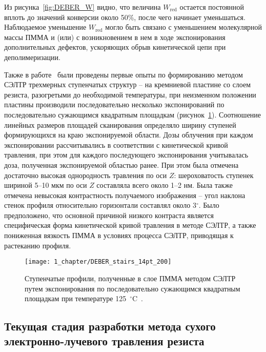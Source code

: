 Из рисунка~\ref{fig:DEBER_W} видно, что величина $W_\mathrm{red}$ остается постоянной вплоть до значений конверсии около 50\%, после чего начинает уменьшаться. Наблюдаемое уменьшение $W_\mathrm{red}$ могло быть связано с уменьшением молекулярной массы ПММА и (или) с возникновением в нем в ходе экспонирования дополнительных дефектов, ускоряющих обрыв кинетической цепи при деполимеризации.

Также в работе~\cite{Bruk_2013} были проведены первые опыты по формированию методом СЭЛТР трехмерных ступенчатых структур -- на кремниевой пластине со слоем резиста, разогретыми до необходимой температуры, при неизменном положении пластины производили последовательно несколько экспонирований по последовательно сужающимся квадратным площадкам (рисунок~\ref{fig:DEBER_stairs}). Соотношение линейных размеров площадей сканирования определяло ширину ступеней формирующихся на краю экспонируемой области. Дозы облучения при каждом экспонировании рассчитывались в соответствии с кинетической кривой травления, при этом для каждого последующего экспонирования учитывалась доза, полученная экспонируемой областью ранее. При этом была отмечена достаточно высокая однородность травления по оси $Z$: шероховатость ступенек шириной 5–10 мкм по оси $Z$ составляла всего около 1–2 нм.
Была также отмечена невысокая контрастность получаемого изображения -- угол наклона стенок профиля относительно горизонтали составлял около 3$^\circ$. Было предположено, что основной причиной низкого контраста является специфическая форма кинетической кривой травления в методе СЭЛТР, а также пониженная вязкость ПММА в условиях процесса СЭЛТР, приводящая к растеканию профиля.

\begin{figure}[t]
	\centering
	\texttt{[image: 1\_chapter/DEBER\_stairs\_14pt\_200]}
	\vspace{0.5em}
	\caption{Ступенчатые профили, полученные в слое ПММА методом СЭЛТР путем экспонирования по последовательно сужающимся квадратным площадкам при температуре 125~$^\circ$C~\cite{Bruk_2013}. \vspace{1.5em}}
	\label{fig:DEBER_stairs}
\end{figure}


\subsection{Текущая стадия разработки метода сухого электронно-лучевого травления резиста}

